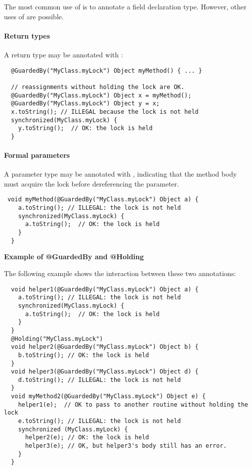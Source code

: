 The most common use of  is to annotate a field declaration
type.  However, other uses of  are possible.

\paragraph{Return types\label{lock-examples-guardedby-return}}

A return type may be annotated with :

\begin{Verbatim}
  @GuardedBy("MyClass.myLock") Object myMethod() { ... }

  // reassignments without holding the lock are OK.
  @GuardedBy("MyClass.myLock") Object x = myMethod();
  @GuardedBy("MyClass.myLock") Object y = x;
  x.toString(); // ILLEGAL because the lock is not held
  synchronized(MyClass.myLock) {
    y.toString();  // OK: the lock is held
  }
\end{Verbatim}

\paragraph{Formal parameters\label{lock-examples-guardedby-formal-parameters}}

A parameter type may be annotated with , indicating that
the method body must acquire the lock before dereferencing the parameter.

\begin{Verbatim}
 void myMethod(@GuardedBy("MyClass.myLock") Object a) {
    a.toString(); // ILLEGAL: the lock is not held
    synchronized(MyClass.myLock) {
      a.toString();  // OK: the lock is held
    }
  }
\end{Verbatim}

\textbf{Example of @GuardedBy and @Holding}

The following example shows the interaction between these two annotations:

\begin{Verbatim}
  void helper1(@GuardedBy("MyClass.myLock") Object a) {
    a.toString(); // ILLEGAL: the lock is not held
    synchronized(MyClass.myLock) {
      a.toString();  // OK: the lock is held
    }
  }
  @Holding("MyClass.myLock")
  void helper2(@GuardedBy("MyClass.myLock") Object b) {
    b.toString(); // OK: the lock is held
  }
  void helper3(@GuardedBy("MyClass.myLock") Object d) {
    d.toString(); // ILLEGAL: the lock is not held
  }
  void myMethod2(@GuardedBy("MyClass.myLock") Object e) {
    helper1(e);  // OK to pass to another routine without holding the lock
    e.toString(); // ILLEGAL: the lock is not held
    synchronized (MyClass.myLock) {
      helper2(e); // OK: the lock is held
      helper3(e); // OK, but helper3's body still has an error.
    }
  }
\end{Verbatim}

